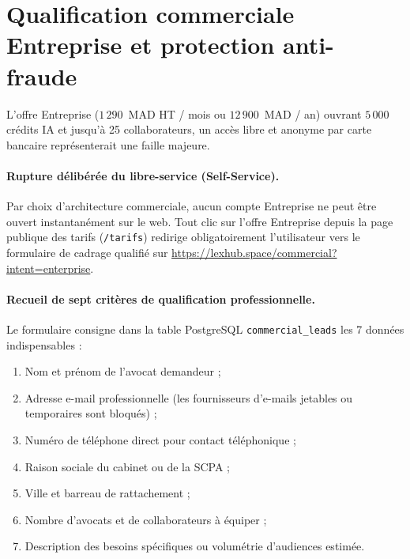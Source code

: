 \section{Qualification commerciale Entreprise et protection anti-fraude}
\label{sec:qualif-entreprise}

L'offre Entreprise ($1\,290$~MAD HT / mois ou $12\,900$~MAD / an) ouvrant $5\,000$ crédits IA et jusqu'à 25 collaborateurs, un accès libre et anonyme par carte bancaire représenterait une faille majeure.

\paragraph{Rupture délibérée du libre-service (Self-Service).}
Par choix d'architecture commerciale, aucun compte Entreprise ne peut être ouvert instantanément sur le web. Tout clic sur l'offre Entreprise depuis la page publique des tarifs (\texttt{/tarifs}) redirige obligatoirement l'utilisateur vers le formulaire de cadrage qualifié sur \url{https://lexhub.space/commercial?intent=enterprise}.

\paragraph{Recueil de sept critères de qualification professionnelle.}
Le formulaire consigne dans la table PostgreSQL \texttt{commercial\_leads} les 7 données indispensables :
\begin{enumerate}[leftmargin=*]
  \item Nom et prénom de l'avocat demandeur ;
  \item Adresse e-mail professionnelle (les fournisseurs d'e-mails jetables ou temporaires sont bloqués) ;
  \item Numéro de téléphone direct pour contact téléphonique ;
  \item Raison sociale du cabinet ou de la SCPA ;
  \item Ville et barreau de rattachement ;
  \item Nombre d'avocats et de collaborateurs à équiper ;
  \item Description des besoins spécifiques ou volumétrie d'audiences estimée.
\end{enumerate}

